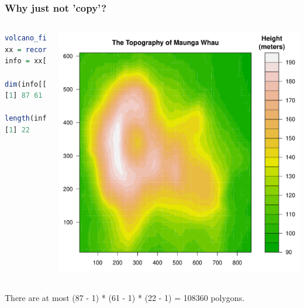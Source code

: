 \documentclass{beamer}
\begin{document}



\begin{frame}[fragile]
\frametitle{Why just not 'copy'?}

\begin{columns}[c]
\begin{lstlisting}[language = R]
volcano_filled.contour()
xx = recordPlot()
info = xx[[1]][[12]][[2]]

dim(info[[4]])
[1] 87 61

length(info[[5]])
[1] 22
 
\end{lstlisting}
\begin{center}
\includegraphics{plot/filled_example_1}
\end{center}

\end{columns}
There are at most (87 - 1) * (61 - 1) * (22 - 1) =  108360 polygons.


\end{frame}


\end{document}
